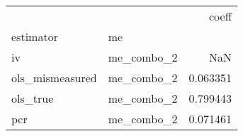 \begin{tabular}{llr}
\toprule
    &            &     coeff \\
estimator & me &           \\
\midrule
iv & me\_combo\_2 &       NaN \\
ols\_mismeasured & me\_combo\_2 &  0.063351 \\
ols\_true & me\_combo\_2 &  0.799443 \\
pcr & me\_combo\_2 &  0.071461 \\
\bottomrule
\end{tabular}

